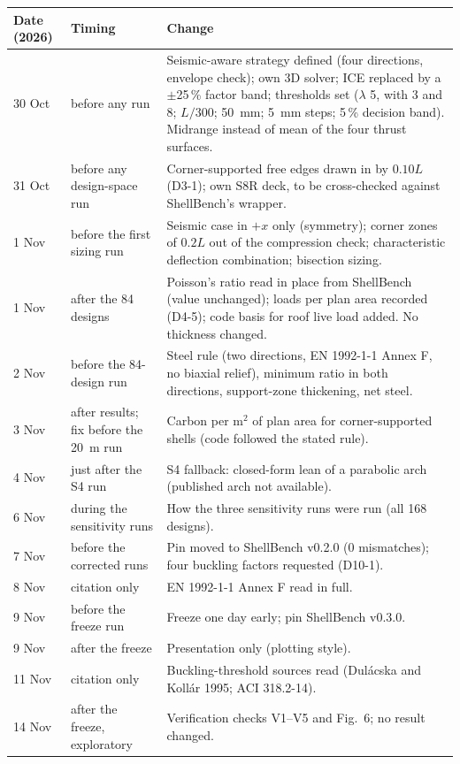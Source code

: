 \documentclass[11pt,a4paper]{article}
\begin{document}
\begin{longtable}{p{}p{}p{}}
\toprule
Date (2026) & Timing & Change\\
\midrule
\endhead
30 Oct & before any run & Seismic-aware strategy defined (four directions, envelope check); own 3D solver; ICE replaced by a $\pm$25\,\% factor band; thresholds set ($\lambda$ 5, with 3 and 8; $L/300$; 50~mm; 5~mm steps; 5\,\% decision band). Midrange instead of mean of the four thrust surfaces.\\
31 Oct & before any design-space run & Corner-supported free edges drawn in by $0.10L$ (D3-1); own S8R deck, to be cross-checked against ShellBench's wrapper.\\
1 Nov & before the first sizing run & Seismic case in $+x$ only (symmetry); corner zones of $0.2L$ out of the compression check; characteristic deflection combination; bisection sizing.\\
1 Nov & after the 84 designs & Poisson's ratio read in place from ShellBench (value unchanged); loads per plan area recorded (D4-5); code basis for roof live load added. No thickness changed.\\
2 Nov & before the 84-design run & Steel rule (two directions, EN 1992-1-1 Annex F, no biaxial relief), minimum ratio in both directions, support-zone thickening, net steel.\\
3 Nov & after results; fix before the 20~m run & Carbon per m$^2$ of plan area for corner-supported shells (code followed the stated rule).\\
4 Nov & just after the S4 run & S4 fallback: closed-form lean of a parabolic arch (published arch not available).\\
6 Nov & during the sensitivity runs & How the three sensitivity runs were run (all 168 designs).\\
7 Nov & before the corrected runs & Pin moved to ShellBench v0.2.0 (0 mismatches); four buckling factors requested (D10-1).\\
8 Nov & citation only & EN 1992-1-1 Annex F read in full.\\
9 Nov & before the freeze run & Freeze one day early; pin ShellBench v0.3.0.\\
9 Nov & after the freeze & Presentation only (plotting style).\\
11 Nov & citation only & Buckling-threshold sources read (Dul\'acska and Koll\'ar 1995; ACI 318.2-14).\\
14 Nov & after the freeze, exploratory & Verification checks V1--V5 and Fig.~6; no result changed.\\
\bottomrule
\end{longtable}
\end{document}
